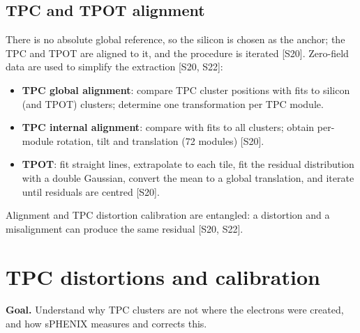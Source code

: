 \documentclass[11pt,letterpaper]{article}
\newcommand{\goal}[1]{\par\noindent\textbf{Goal.} #1\par}
\begin{document}
\subsection{TPC and TPOT alignment}
There is no absolute global reference, so the silicon is chosen as the anchor; the TPC and TPOT are aligned to it, and the procedure is iterated [S20].
Zero-field data are used to simplify the extraction [S20, S22]:
\begin{itemize}
\item \textbf{TPC global alignment}: compare TPC cluster positions with fits to silicon (and TPOT) clusters; determine one transformation per TPC module.
\item \textbf{TPC internal alignment}: compare with fits to all clusters; obtain per-module rotation, tilt and translation (72 modules) [S20].
\item \textbf{TPOT}: fit straight lines, extrapolate to each tile, fit the residual distribution with a double Gaussian, convert the mean to a global translation, and iterate until residuals are centred [S20].
\end{itemize}
Alignment and TPC distortion calibration are entangled: a distortion and a misalignment can produce the same residual [S20, S22].
\section{TPC distortions and calibration}\label{sec:tpccal}
\goal{Understand why TPC clusters are not where the electrons were created, and how sPHENIX measures and corrects this.}
\end{document}
